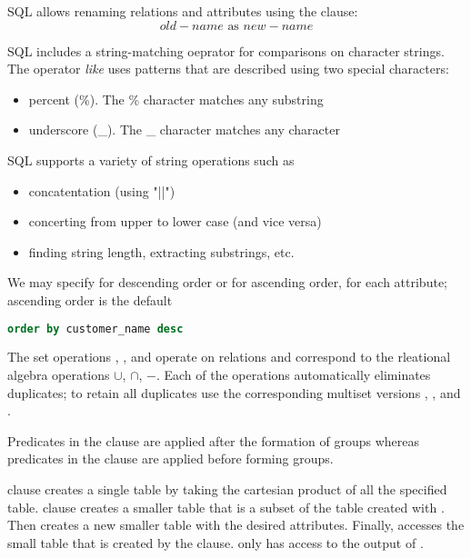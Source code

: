 \documentclass{article}
\begin{document}
SQL allows renaming relations and attributes using the  clause: $$old-name \textrm{ as } new-name$$

SQL includes a string-matching oeprator for comparisons on character strings. The operator \emph{like} uses patterns that are described using two special characters: 
\begin{itemize}
  \item percent (\%). The \% character matches any substring 
  \item underscore (\_). The \_ character matches any character
\end{itemize}
SQL supports a variety of string operations such as 
\begin{itemize}
  \item concatentation (using "||")
  \item concerting from upper to lower case (and vice versa) 
  \item finding string length, extracting substrings, etc.
\end{itemize}

We may specify  for descending order or  for ascending order, for each attribute; ascending order is the default 
\begin{lstlisting}[language=SQL]
  order by customer_name desc
\end{lstlisting}

The set operations , , and  operate on relations and correspond to the rleational algebra operations $\cup$, $\cap$, $-$. Each of the operations automatically eliminates duplicates; to retain all duplicates use the corresponding multiset versions , , and . 

\begin{remark}
  Predicates in the  clause are applied after the formation of groups whereas predicates in the  clause are applied before forming groups. 
\end{remark}

 clause creates a single table by taking the cartesian product of all the specified table.  clause creates a smaller table that is a subset of the table created with . Then  creates a new smaller table with the desired attributes. Finally,  accesses the small table that is created by the  clause.  only has access to the output of . \\ 
\end{document}
